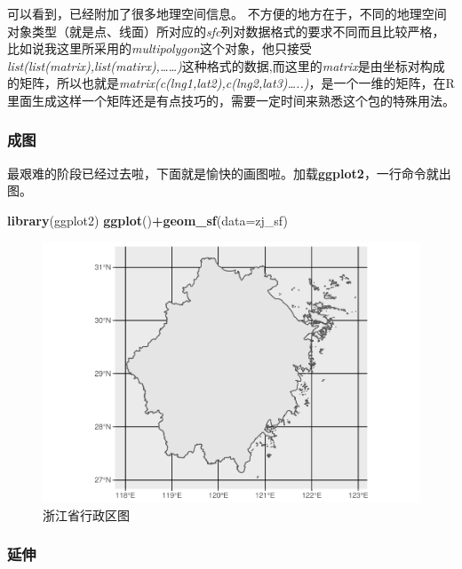 \documentclass[]{article}
\newenvironment{Shaded}{\begin{snugshade}}{\end{snugshade}}
\newcommand{\KeywordTok}[1]{\textcolor[rgb]{0.13,0.29,0.53}{\textbf{#1}}}
\newcommand{\DataTypeTok}[1]{\textcolor[rgb]{0.13,0.29,0.53}{#1}}
\newcommand{\OperatorTok}[1]{\textcolor[rgb]{0.81,0.36,0.00}{\textbf{#1}}}
\newcommand{\NormalTok}[1]{#1}
\begin{document}
可以看到，已经附加了很多地理空间信息。
不方便的地方在于，不同的地理空间对象类型（就是点、线面）所对应的\emph{sfc}列对数据格式的要求不同而且比较严格，比如说我这里所采用的\emph{multipolygon}这个对象，他只接受\emph{list(list(matrix),list(matirx),\ldots{}\ldots{})}这种格式的数据,而这里的\emph{matrix}是由坐标对构成的矩阵，所以也就是\emph{matrix(c(lng1,lat2),c(lng2,lat3)\ldots{}..)}，是一个一维的矩阵，在R里面生成这样一个矩阵还是有点技巧的，需要一定时间来熟悉这个包的特殊用法。

\subsubsection{成图}

最艰难的阶段已经过去啦，下面就是愉快的画图啦。加载\textbf{ggplot2}，一行命令就出图。

\begin{Shaded}
\begin{Highlighting}[]
\KeywordTok{library}\NormalTok{(ggplot2)}
\KeywordTok{ggplot}\NormalTok{()}\OperatorTok{+}\KeywordTok{geom_sf}\NormalTok{(}\DataTypeTok{data=}\NormalTok{zj_sf)}
\end{Highlighting}
\end{Shaded}

\begin{figure}

{\centering \includegraphics{利用高德地图API接口生成行政区划图_files/figure-latex/ggplot_zj-1} 

}

\caption{浙江省行政区图}\label{fig:ggplot_zj}
\end{figure}

\subsubsection{延伸}
\end{document}
